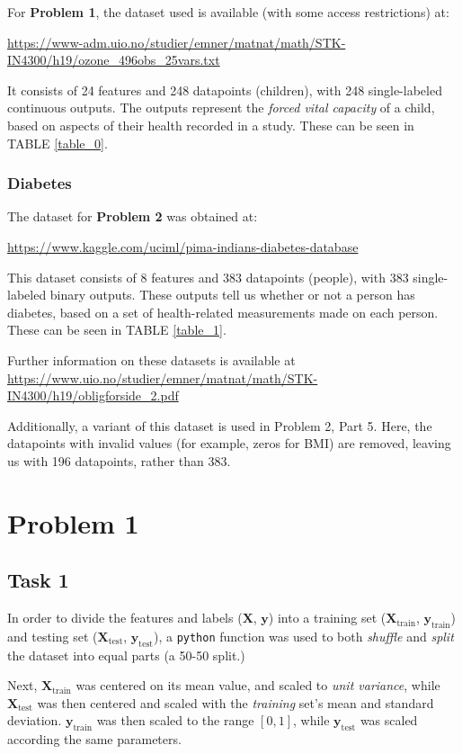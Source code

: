 \documentclass[twoside,twocolumn,10pt]{revtex4-1}
\begin{document}
	For \textbf{Problem 1}, the dataset used is available (with some access restrictions) at:
	
	\url{https://www-adm.uio.no/studier/emner/matnat/math/STK-IN4300/h19/ozone\_496obs\_25vars.txt}
	
	It consists of 24 features and 248 datapoints (children), with 248 single-labeled continuous outputs.  The outputs represent the \textit{forced vital capacity} of a child, based on aspects of their health recorded in a study. These can be seen in TABLE \ref{table_0}.
	
	\subsubsection{Diabetes}	
	
	The dataset for \textbf{Problem 2} was obtained at:
	
	\url{https://www.kaggle.com/uciml/pima-indians-diabetes-database}
	
	This dataset consists of 8 features and 383 datapoints (people), with 383 single-labeled binary outputs.  These outputs tell us whether or not a person has diabetes, based on a set of health-related measurements made on each person. These can be seen in TABLE \ref{table_1}.
		
	Further information on these datasets is available at \url{https://www.uio.no/studier/emner/matnat/math/STK-IN4300/h19/obligforside\_2.pdf}
	
	Additionally, a variant of this dataset is used in Problem 2, Part 5.  Here, the datapoints with invalid values (for example, zeros for BMI) are removed, leaving us with 196 datapoints, rather than 383.
	
	\section{Problem 1}
	
	\subsection*{Task 1}
	
	In order to divide the features and labels ($\mathbf{X}$, $\mathbf{y}$) into a training set ($\mathbf{X}_\text{train}$, $\mathbf{y}_\text{train}$) and testing set ($\mathbf{X}_\text{test}$, $\mathbf{y}_\text{test}$), a \texttt{python} function was used to both \textit{shuffle} and \textit{split} the dataset into equal parts (a 50-50 split.)  
	
	Next, $\mathbf{X}_\text{train}$ was centered on its mean value, and scaled to \textit{unit variance}, while $\mathbf{X}_\text{test}$ was then centered and scaled with the \textit{training} set's mean and standard deviation.  $\mathbf{y}_\text{train}$ was then scaled to the range $[0,1]$, while $\mathbf{y}_\text{test}$ was scaled according the same parameters.
	
\end{document}
